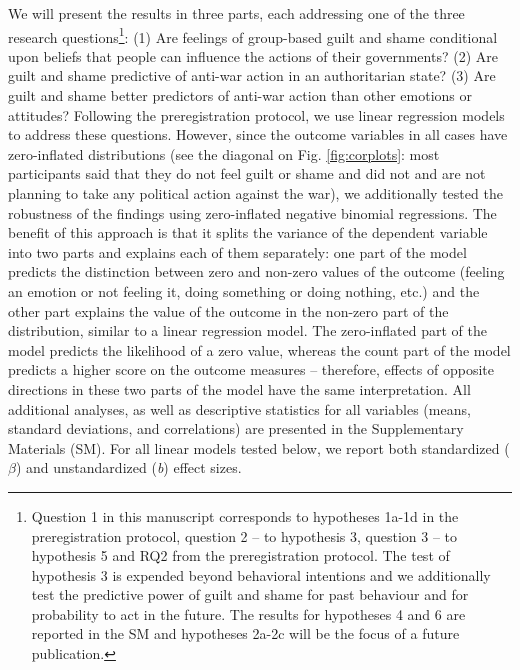 \documentclass[
]{article}
\begin{document}
We will present the results in three parts, each addressing one of the three research questions\footnote{Question 1 in this manuscript corresponds to hypotheses 1a-1d in the preregistration protocol, question 2 -- to hypothesis 3, question 3 -- to hypothesis 5 and RQ2 from the preregistration protocol. The test of hypothesis 3 is expended beyond behavioral intentions and we additionally test the predictive power of guilt and shame for past behaviour and for probability to act in the future. The results for hypotheses 4 and 6 are reported in the SM and hypotheses 2a-2c will be the focus of a future publication.}: (1) Are feelings of group-based guilt and shame conditional upon beliefs that people can influence the actions of their governments? (2) Are guilt and shame predictive of anti-war action in an authoritarian state? (3) Are guilt and shame better predictors of anti-war action than other emotions or attitudes? Following the preregistration protocol, we use linear regression models to address these questions. However, since the outcome variables in all cases have zero-inflated distributions (see the diagonal on Fig. \ref{fig:corplots}: most participants said that they do not feel guilt or shame and did not and are not planning to take any political action against the war), we additionally tested the robustness of the findings using zero-inflated negative binomial regressions. The benefit of this approach is that it splits the variance of the dependent variable into two parts and explains each of them separately: one part of the model predicts the distinction between zero and non-zero values of the outcome (feeling an emotion or not feeling it, doing something or doing nothing, etc.) and the other part explains the value of the outcome in the non-zero part of the distribution, similar to a linear regression model. The zero-inflated part of the model predicts the likelihood of a zero value, whereas the count part of the model predicts a higher score on the outcome measures -- therefore, effects of opposite directions in these two parts of the model have the same interpretation. All additional analyses, as well as descriptive statistics for all variables (means, standard deviations, and correlations) are presented in the Supplementary Materials (SM). For all linear models tested below, we report both standardized (\(\beta\)) and unstandardized (\emph{b}) effect sizes.
\end{document}
